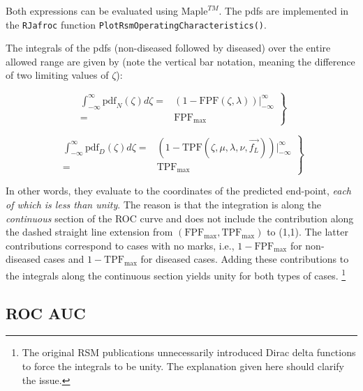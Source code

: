 \documentclass[
]{book}
\begin{document}
Both expressions can be evaluated using \(\text{Maple}^{TM}\). The pdfs are implemented in the \texttt{RJafroc} function \texttt{PlotRsmOperatingCharacteristics()}.

The integrals of the pdfs (non-diseased followed by diseased) over the entire allowed range are given by (note the vertical bar notation, meaning the difference of two limiting values of \(\zeta\)):

\begin{equation}
\left. 
\begin{aligned}
\int_{-\infty}^{\infty}\text{pdf}_N \left ( \zeta \right )d \zeta =& \left ( 1-\text{FPF}\left (\zeta , \lambda\right ) \right ) \bigg \rvert_{-\infty}^{\infty}\\
=& \text{FPF}_{\text{max}}
\end{aligned}
\right \}
\label{eq:rsm-predictions-int-pdf-n}
\end{equation}

\begin{equation}
\left. 
\begin{aligned}
\int_{-\infty}^{\infty}\text{pdf}_D \left ( \zeta \right )d \zeta =& \left ( 1-\text{TPF}\left (\zeta , \mu, \lambda, \nu, \overrightarrow{f_L} \right ) \right ) \bigg \rvert_{-\infty}^{\infty}\\
=& \text{TPF}_{\text{max}}
\end{aligned}
\right \}
\label{eq:rsm-predictions-int-pdf-d}
\end{equation}

In other words, they evaluate to the coordinates of the predicted end-point, \emph{each of which is less than unity}. The reason is that the integration is along the \emph{continuous} section of the ROC curve and does not include the contribution along the dashed straight line extension from \(\left ( \text{FPF}_{\text{max}}, \text{TPF}_{\text{max}} \right )\) to (1,1). The latter contributions correspond to cases with no marks, i.e., \(1 - \text{FPF}_{\text{max}}\) for non-diseased cases and \(1 - \text{TPF}_{\text{max}}\) for diseased cases. Adding these contributions to the integrals along the continuous section yields unity for both types of cases. \footnote{The original RSM publications \citep{chakraborty2006search, chakraborty2006roc} unnecessarily introduced Dirac delta functions to force the integrals to be unity. The explanation given here should clarify the issue.}

\hypertarget{rsm-predictions-roc-curve-auc}{%
\subsection{ROC AUC}\label{rsm-predictions-roc-curve-auc}}
\end{document}
